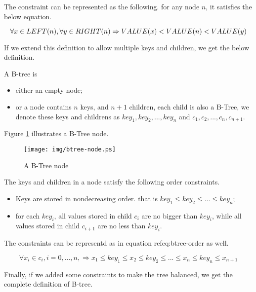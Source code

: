 \documentclass{article}
\begin{document}
The constraint can be represented as the following. for any node $n$,
it satisfies the below equation.

\begin{equation}
\forall x \in LEFT(n), \forall y \in RIGHT(n) \\
\Rightarrow VALUE(x)<VALUE(n)<VALUE(y)
\end{equation}

If we extend this definition to allow multiple keys and children, we get the 
below definition.

A B-tree is 
\begin{itemize}
\item either an empty node;
\item or a node contains $n$ keys, and $n+1$ children, each child is
also a B-Tree, we denote these keys and childrens as $key_1, key_2,
..., key_n$ and $c_1, c_2, ..., c_n, c_{n+1}$.
\end{itemize}

Figure \ref{fig:btree-node} illustrates a B-Tree node.

\begin{figure}[htbp]
       \begin{center}
	\texttt{[image: img/btree-node.ps]}
        \caption{A B-Tree node} \label{fig:btree-node}
       \end{center}
\end{figure}

The keys and children in a node satisfy the following order constraints.

\begin{itemize}
\item Keys are stored in nondecreasing order. that is $key_1 \leq
key_2 \leq ... \leq key_n$;
\item for each $key_i$, all values stored in child $c_i$ are no bigger 
than $key_i$, while all values stored in child $c_{i+1}$ are no less
than $key_i$.
\end{itemize}

The constraints can be representd as in equation ref{eq:btree-order}
as well.

\begin{equation}
\forall x_i \in c_i, i=0, ..., n, \Rightarrow x_1 \leq key_1 \leq
x_2 \leq key_2 \leq ... \leq x_n \leq key_n \leq x_{n+1}
\end{equation}

Finally, if we added some constraints to make the tree balanced, we get the
complete definition of B-tree.
\end{document}
